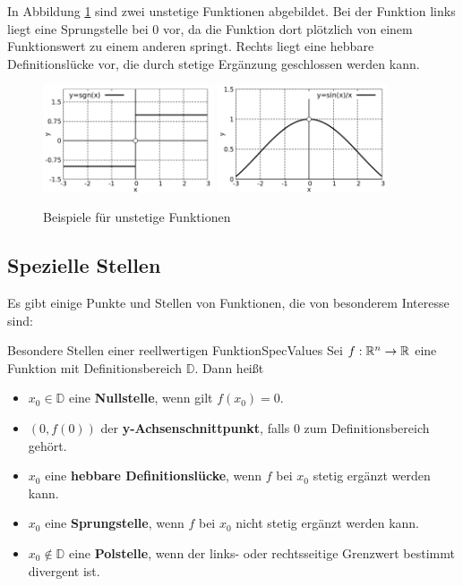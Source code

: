 In Abbildung \ref{fig:NonContFun} sind zwei unstetige Funktionen abgebildet. Bei der Funktion links liegt eine Sprungstelle bei $0$ vor, da die Funktion dort plötzlich von einem Funktionswert zu einem anderen springt. Rechts liegt eine hebbare Definitionslücke vor, die durch stetige Ergänzung geschlossen werden kann.

\begin{figure}
    \centering
    \includegraphics[width=0.45\textwidth]{./gnuplot/example-non-continous-function-1}
    \includegraphics[width=0.45\textwidth]{./gnuplot/example-non-continous-function-2}
    \caption{Beispiele für unstetige Funktionen}
    \label{fig:NonContFun}
\end{figure}

\subsection{Spezielle Stellen}

Es gibt einige Punkte und Stellen von Funktionen, die von besonderem Interesse sind:

\begin{definition}{Besondere Stellen einer reellwertigen Funktion}{SpecValues}
    Sei $f: \mathbb{R}^n\to\mathbb{R}$ eine Funktion mit Definitionsbereich $\mathbb{D}$. Dann heißt
    \begin{itemize}
        \item $x_0\in\mathbb{D}$ eine \textbf{Nullstelle}, wenn gilt $f(x_0) = 0$.
        \item $(0, f(0))$ der \textbf{y-Achsenschnittpunkt}, falls $0$ zum Definitionsbereich gehört.
        \item $x_0$ eine \textbf{hebbare Definitionslücke}, wenn $f$ bei $x_0$ stetig ergänzt werden kann.
        \item $x_0$ eine \textbf{Sprungstelle}, wenn $f$ bei $x_0$ nicht stetig ergänzt werden kann.
        \item $x_0 \notin \mathbb{D}$ eine \textbf{Polstelle}, wenn der links- oder rechtsseitige Grenzwert bestimmt divergent ist.
    \end{itemize}
\end{definition}

